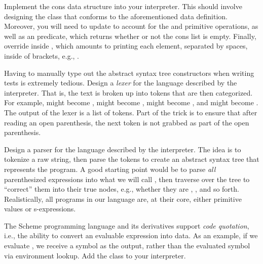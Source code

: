 Implement the cons data structure into your interpreter. This should involve designing the  class that conforms to the aforementioned data definition. Moreover, you will need to update  to account for the  and  primitive operations, as well as an  predicate, which returns whether or not the cons list is empty. Finally, override  inside , which amounts to printing each element, separated by spaces, inside of brackets, e.g., \ttt{[$l_0, l_1, \ldots, l_{n-1}]$}.

Having to manually type out the abstract syntax tree constructors when writing tests is extremely tedious. Design a \emph{lexer} for the language described by the interpreter. That is, the text is broken up into tokens that are then categorized. For example, \ttt{\q{}(\q{}} might become ,  might become ,  might become , and  might become . The output of the lexer is a list of tokens. Part of the trick is to ensure that after reading an open parenthesis, the next token is not grabbed as part of the open parenthesis.

Design a parser for the language described by the interpreter. The idea is to tokenize a raw string, then parse the tokens to create an abstract syntax tree that represents the program. A good starting point would be to parse \emph{all} parenthesized expressions into what we will call , then traverse over the tree to ``correct'' them into their true nodes, e.g., whether they are , , and so forth. Realistically, all programs in our language are, at their core, either primitive values or s-expressions.

The Scheme programming language and its derivatives support \emph{code quotation}, i.e., the ability to convert an evaluable expression into data. As an example, if we evaluate , we receive a symbol as the output, rather than the evaluated symbol via environment lookup. Add the  class to your interpreter.


